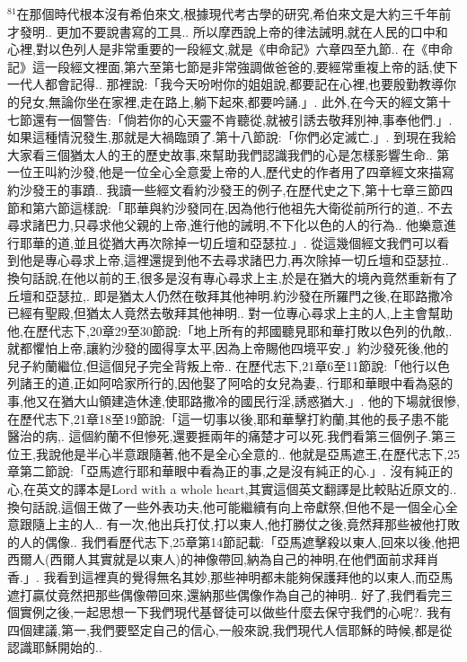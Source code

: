 \documentclass{book}
\begin{document}
$^{81}$在那個時代根本沒有希伯來文,根據現代考古學的研究,希伯來文是大約三千年前才發明..
更加不要說書寫的工具..
所以摩西說上帝的律法誡明,就在人民的口中和心裡,對以色列人是非常重要的一段經文,就是《申命記》六章四至九節..
在《申命記》這一段經文裡面,第六至第七節是非常強調做爸爸的,要經常重複上帝的話,使下一代人都會記得..
那裡說:「我今天吩咐你的姐姐說,都要記在心裡,也要殷勤教導你的兒女,無論你坐在家裡,走在路上,躺下起來,都要吟誦.」.
此外,在今天的經文第十七節還有一個警告:「倘若你的心天靈不肯聽從,就被引誘去敬拜別神,事奉他們.」.
如果這種情況發生,那就是大禍臨頭了.第十八節說:「你們必定滅亡.」.
到現在我給大家看三個猶太人的王的歷史故事,來幫助我們認識我們的心是怎樣影響生命..
第一位王叫約沙發,他是一位全心全意愛上帝的人,歷代史的作者用了四章經文來描寫約沙發王的事蹟..
我讀一些經文看約沙發王的例子,在歷代史之下,第十七章三節四節和第六節這樣說:「耶華與約沙發同在,因為他行他祖先大衛從前所行的道,.
不去尋求諸巴力,只尋求他父親的上帝,進行他的誡明,不下化以色的人的行為..
他樂意進行耶華的道,並且從猶大再次除掉一切丘壇和亞瑟拉.」.
從這幾個經文我們可以看到他是專心尋求上帝,這裡還提到他不去尋求諸巴力,再次除掉一切丘壇和亞瑟拉..
換句話說,在他以前的王,很多是沒有專心尋求上主,於是在猶大的境內竟然重新有了丘壇和亞瑟拉,.
即是猶太人仍然在敬拜其他神明.約沙發在所羅門之後,在耶路撒冷已經有聖殿,但猶太人竟然去敬拜其他神明..
對一位專心尋求上主的人,上主會幫助他,在歷代志下,20章29至30節說:「地上所有的邦國聽見耶和華打敗以色列的仇敵,.
就都懼怕上帝,讓約沙發的國得享太平,因為上帝賜他四境平安.」約沙發死後,他的兒子約蘭繼位,但這個兒子完全背叛上帝..
在歷代志下,21章6至11節說:「他行以色列諸王的道,正如阿哈家所行的,因他娶了阿哈的女兒為妻,.
行耶和華眼中看為惡的事,他又在猶大山領建造休達,使耶路撒冷的國民行淫,誘惑猶大.」.
他的下場就很慘,在歷代志下,21章18至19節說:「這一切事以後,耶和華擊打約蘭,其他的長子患不能醫治的病,.
這個約蘭不但慘死,還要捱兩年的痛楚才可以死.我們看第三個例子.第三位王,我說他是半心半意跟隨著,他不是全心全意的..
他就是亞馬遮王,在歷代志下,25章第二節說:「亞馬遮行耶和華眼中看為正的事,之是沒有純正的心.」.
沒有純正的心,在英文的譯本是Lord with a whole heart,其實這個英文翻譯是比較貼近原文的..
換句話說,這個王做了一些外表功夫,他可能繼續有向上帝獻祭,但他不是一個全心全意跟隨上主的人..
有一次,他出兵打仗,打以東人,他打勝仗之後,竟然拜那些被他打敗的人的偶像..
我們看歷代志下,25章第14節記載:「亞馬遮擊殺以東人,回來以後,他把西爾人(西爾人其實就是以東人)的神像帶回,納為自己的神明,在他們面前求拜肖香.」.
我看到這裡真的覺得無名其妙,那些神明都未能夠保護拜他的以東人,而亞馬遮打贏仗竟然把那些偶像帶回來,還納那些偶像作為自己的神明..
好了,我們看完三個實例之後,一起思想一下我們現代基督徒可以做些什麼去保守我們的心呢?.
我有四個建議,第一,我們要堅定自己的信心,一般來說,我們現代人信耶穌的時候,都是從認識耶穌開始的..
\end{document}
